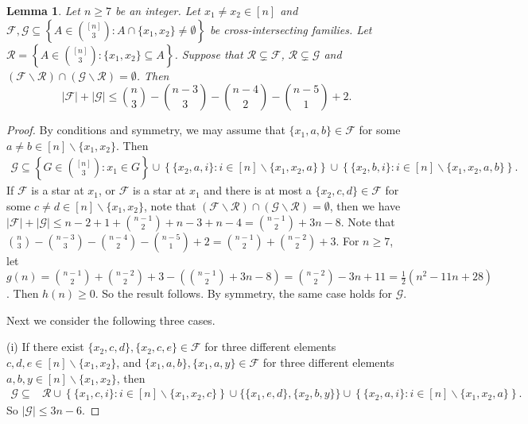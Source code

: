 \documentclass[11pt]{article}
\numberwithin{equation}{section}
\newtheorem{lemma}[theorem]{Lemma}
\begin{document}
\begin{lemma}\label{Lem52}
 Let $n \geq 7$ be an integer.  Let $x_1\neq x_2\in [n]$ and $\mathcal{F}, \mathcal{G} \subseteq\left\{A \in\binom{[n]}{3}:  A\cap \{x_1, x_2\}\neq \emptyset\right\}$ be cross-intersecting families. Let $
\mathcal{R}=\left\{A \in\binom{[n]}{3}: \{x_1,x_2\} \subseteq A \right\}$.
Suppose that $\mathcal{R}\subsetneq \mathcal{F}$, $\mathcal{R}\subsetneq \mathcal{G}$ and $(\mathcal{F}\backslash\mathcal{R}) \cap(\mathcal{G}\backslash\mathcal{R}) =\emptyset$.
Then
$$
|\mathcal{F}|+|\mathcal{G}| \leq\binom{n}{3}-\binom{n-3}{3}-\binom{n-4}{2}-\binom{n-5}{1}+2.
$$
\end{lemma}
\begin{proof}
By conditions and symmetry, we may assume that $\{x_1, a, b\}\in \mathcal{F}$ for some
$a\neq b\in [n]\backslash \{x_1, x_2\}$. Then
\begin{align*}
\mathcal{G}\subseteq\left\{G \in\binom{[n]}{3}: x_1\in G\right\}\cup\left\{\{x_2,a, i\}:  i\in [n]\backslash\{x_1,x_2,a\}\right\}\cup\left\{\{x_2,b, i\}:  i\in [n]\backslash\{x_1,x_2,a, b\}\right\}.
\end{align*}
If $\mathcal{F}$ is a star at $x_1$, or $\mathcal{F}$ is a star at $x_1$ and there is at most a $\{x_2, c, d\}\in \mathcal{F}$ for some
$c\neq d\in [n]\backslash \{x_1, x_2\}$, note that $(\mathcal{F}\backslash\mathcal{R}) \cap(\mathcal{G}\backslash\mathcal{R}) =\emptyset$, then we have
$
|\mathcal{F}|+|\mathcal{G}|\leq n-2+1+ \binom{n-1}{2}+n-3+n-4
=\binom{n-1}{2}+3n-8
$.
Note that $\binom{n}{3}-\binom{n-3}{3}-\binom{n-4}{2}-\binom{n-5}{1}+2=\binom{n-1}{2}+\binom{n-2}{2}+3$.
For $n\geq 7$, let
$
g(n)=\binom{n-1}{2}+\binom{n-2}{2}+3-\left(\binom{n-1}{2}+3n-8\right)
=\binom{n-2}{2}-3n+11=\frac{1}{2}\left(n^2-11n+28 \right)
$.
Then $h(n)\geq 0$. So the result follows. By symmetry, the same case holds for $\mathcal{G}$.

Next we consider the following three cases.

(i) If there exist $\{x_2, c, d\}, \{x_2, c, e\}\in \mathcal{F}$ for three different elements $c, d, e\in [n]\backslash \{x_1, x_2\}$, and $\{x_1, a, b\}, \{x_1, a, y\}\in \mathcal{F}$ for three different elements $a, b, y\in [n]\backslash \{x_1, x_2\}$, then
\begin{align*}
\mathcal{G}\subseteq&\mathcal{R}\cup\left\{\{x_1,c, i\}:  i\in [n]\backslash\{x_1,x_2,c\}\right\}\cup\{\{x_1,e, d\}, \{x_2,b, y\}\}\cup\left\{\{x_2,a, i\}:  i\in [n]\backslash\{x_1,x_2,a\}\right\}.
\end{align*}
So $|\mathcal{G}|\leq 3n-6$.


\end{proof}
\end{document}

